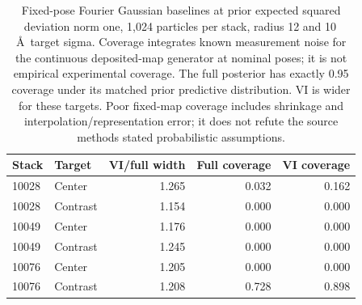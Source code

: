 \begin{table}[t]
\centering\small
\begin{tabular}{llrrr}
\toprule
Stack & Target & VI/full width & Full coverage & VI coverage\\
\midrule
10028 & Center & 1.265 & 0.032 & 0.162\\
10028 & Contrast & 1.154 & 0.000 & 0.000\\
10049 & Center & 1.176 & 0.000 & 0.000\\
10049 & Contrast & 1.245 & 0.000 & 0.000\\
10076 & Center & 1.205 & 0.000 & 0.000\\
10076 & Contrast & 1.208 & 0.728 & 0.898\\
\bottomrule
\end{tabular}
\caption{Fixed-pose Fourier Gaussian baselines at prior expected squared deviation norm one, 1,024 particles per stack, radius 12 and 10\,\AA\ target sigma. Coverage integrates known measurement noise for the continuous deposited-map generator at nominal poses; it is not empirical experimental coverage. The full posterior has exactly 0.95 coverage under its matched prior predictive distribution. VI is wider for these targets. Poor fixed-map coverage includes shrinkage and interpolation/representation error; it does not refute the source method\textquotesingle s stated probabilistic assumptions.}
\label{tab:fouriervi}
\end{table}
